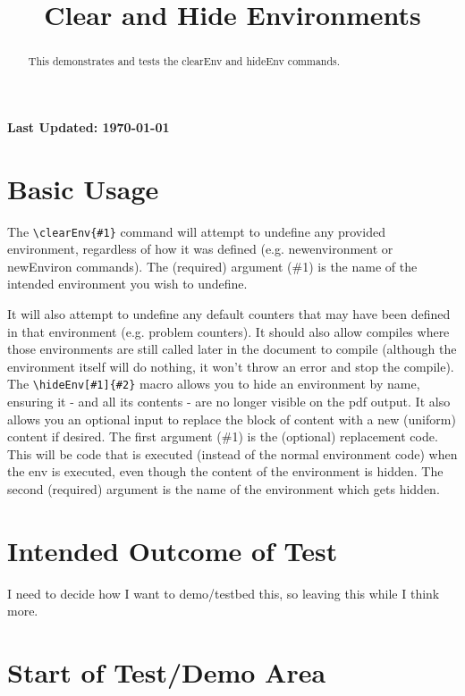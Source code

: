 \documentclass{ximera}
\title{Clear and Hide Environments}
\begin{document}
\begin{abstract}
    This demonstrates and tests the clearEnv and hideEnv commands.    
\end{abstract}
\maketitle

{{\Huge \bfseries Last Updated: \today}} \\



\section{Basic Usage}
The \verb|\clearEnv{#1}| command will attempt to undefine any provided environment, 
regardless of how it was defined (e.g. newenvironment or newEnviron commands).
The (required) argument (\#1) is the name of the intended environment you wish to undefine.

It will also attempt to undefine any default counters that may have been defined in that environment
(e.g. problem counters). It should also allow compiles where those environments are still called later in 
the document to compile (although the environment itself will do nothing, it won't throw an error and stop the compile).\\

The \verb|\hideEnv[#1]{#2}| macro allows you to hide an environment by name, ensuring it - and all its contents - 
are no longer visible on the pdf output. It also allows you an optional input to replace the block of content with 
a new (uniform) content if desired.
The first argument (\#1) is the (optional) replacement code. This will be code that is executed (instead of the normal environment code)
when the env is executed, even though the content of the environment is hidden. The second (required) argument is the name of the environment 
which gets hidden.

\section{Intended Outcome of Test}

{{\Huge I need to decide how I want to demo/testbed this, so leaving this while I think more.}}

\section{Start of Test/Demo Area}


\hrulefill
\end{document}
